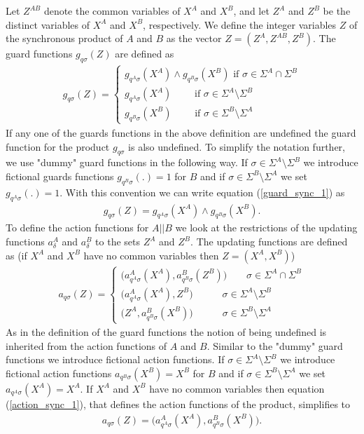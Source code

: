 \documentclass{article}
\begin{document}
 Let $Z^{AB}$ denote the common variables of $X^{A}$ and $X^{B}$, and let $Z^A$
and $Z^B$ be the distinct variables of $X^{A}$ and $X^{B}$,
respectively. We define the integer variables $Z$ of the
synchronous product of $A$ and $B$ as the vector $Z=(Z^A, Z^{AB},
Z^B)$. The guard functions $g_{q \sigma}(Z)$ are defined as
\begin{eqnarray}\label{guard_sync_1}
g_{q \sigma}(Z)=\left\{
\begin{array}{ll}
g_{q^A\sigma}(X^{A})\wedge g_{q^B\sigma}(X^{B}) \textrm{ if }\sigma\in \Sigma^A \cap \Sigma^B\\
g_{q^A\sigma}(X^{A}) \quad\quad \textrm{ if } \sigma\in \Sigma^A \setminus \Sigma^B\\
g_{q^B\sigma}(X^{B}) \quad\quad \textrm{ if }
\sigma\in\Sigma^B\setminus \Sigma^A
\end{array}\right.
\end{eqnarray}
If any one of the guards functions in the above definition are
undefined the guard function for the product $g_{q \sigma}$ is
also undefined. To simplify the notation further, we use "dummy"
guard functions in the following way. If $\sigma\in \Sigma^A
\setminus \Sigma^B$ we introduce fictional guards functions
$g_{q^B\sigma}(.)=1$ for $B$ and if $\sigma\in\Sigma^B\setminus
\Sigma^A$ we set $g_{q^A\sigma}(.)=1$. With this convention we can
write equation (\ref{guard_sync_1}) as
\begin{eqnarray}
g_{q \sigma}(Z)= g_{q^A\sigma}(X^{A})\wedge g_{q^B\sigma}(X^{B}).
\end{eqnarray}
To define the action functions for $A||B$ we look at the
restrictions of the updating functions $a^A_\delta$ and
$a^B_\delta$ to the sets $Z^A$ and $Z^B$. The updating functions
are defined as (if $X^{A}$ and $X^{B}$ have no common variables
then $Z=(X^{A},X^{B})$)
\begin{eqnarray}\label{action_sync_1}
a_{q \sigma}(Z)=\left\{
\begin{array}{ll}
 \big(a^A_{q^A \sigma}(X^{A}), a^B_{q^B \sigma}(Z^{B})\big)\quad\quad\sigma\in \Sigma^A \cap \Sigma^B\\
\big(a^A_{q^A \sigma}(X^{A}), Z^{B}\big)\quad\quad\quad\sigma\in \Sigma^A \setminus \Sigma^B\\
\big(Z^{A}, a^B_{q^B \sigma}(X^{B})\big)\quad\quad\quad\sigma\in
\Sigma^B \setminus \Sigma^A
\end{array}\right.
\end{eqnarray}
As in the definition of the guard functions the notion of being
undefined is inherited from the action functions of $A$ and $B$.
Similar to the "dummy" guard functions we introduce fictional
action functions. If $\sigma\in \Sigma^A \setminus \Sigma^B$ we
introduce fictional action functions $a_{q^B\sigma}(X^B)=X^B$ for
$B$ and if $\sigma\in\Sigma^B\setminus \Sigma^A$ we set
$a_{q^A\sigma}(X^A)=X^A$. If $X^{A}$ and $X^{B}$ have no common
variables then equation (\ref{action_sync_1}), that defines the
action functions of the product, simplifies to
\begin{eqnarray}
a_{q \sigma}(Z)=
 \big(a^A_{q^A \sigma}(X^{A}), a^B_{q^B \sigma}(X^{B})\big).
\end{eqnarray}
\end{document}
